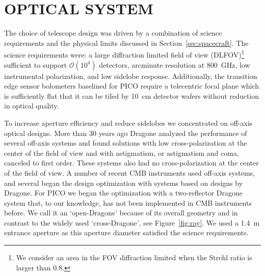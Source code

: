 \documentclass[]{spie}  %
\begin{document}


\section{OPTICAL SYSTEM}
\label{sec:optics}


The choice of telescope design was driven by a combination of science
requirements and the physical limits discussed in Section~\ref{sec:spacecraft}.  The science requirements were: a large diffraction 
limited field of view (DLFOV)\footnote{ We consider an area in the FOV diffraction limited when the Strehl ratio is 
larger than 0.8.} sufficient to support $\mathcal{O}(10^4)$ detectors, arcminute resolution at 800~GHz, low 
instrumental polarization, and low sidelobe response. Additionally, 
the transition edge sensor bolometers baselined for PICO require a telecentric focal plane which is sufficiently flat that it 
can be tiled by 10~cm detector wafers without reduction in optical quality. 

To increase aperture efficiency and reduce sidelobes we concentrated on off-axis optical designs.
More than 30 years ago Dragone analyzed the 
performance of several off-axis systems and found solutions with low cross-polarization at the center of the field 
of view and with astigmatism, or astigmatism and coma, canceled to first order.\cite{dragone,dragone_coma,dragone1983} These
systems also had no cross-polarization at the center of the field of view. 
A number of recent CMB instruments used off-axis systems, and several 
began the design optimization with systems based on designs by
Dragone\cite{planck2000_optics,ACT2011_optics,SPT2008_optics,core2018_inst,LB2016_optics,parshley_ccat_spie}. 
For PICO we began 
the optimization with a two-reflector Dragone system that, to our knowledge, has not been implemented in CMB instruments before. 
We call it an `open-Dragone' because of its overall geometry and in contrast to the widely used `cross-Dragone', see Figure~\ref{fig:ray}. 
We used a 1.4~m entrance aperture as this aperture diameter satisfied the science requirements.
\end{document}
